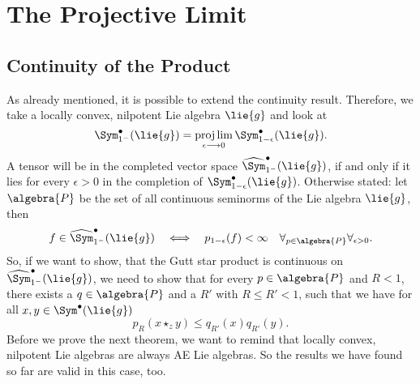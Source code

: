  
\section{The Projective Limit} 
\label{sec:chap6_ProjLim} 

\subsection{Continuity of the Product}

As already mentioned, it is possible to extend the continuity result. 
Therefore, we take a locally convex, nilpotent Lie algebra $\lie{g}$ and look at
\begin{equation*}
	\Sym_{1^-}^{\bullet}(\lie{g})
	=
	\projlim_{\epsilon \longrightarrow 0}
	\Sym_{1 - \epsilon}^{\bullet}(\lie{g}).
\end{equation*}
A tensor will be in the completed vector space $\widehat{\Sym}_{1^-}^{\bullet}
(\lie{g})$, if and only if it lies for every $\epsilon > 0$ in the completion of 
$\Sym_{1 - \epsilon}^{\bullet}(\lie{g})$. Otherwise stated: let $\algebra{P}$ 
be the set of all continuous seminorms of the Lie algebra $\lie{g}$, then 
\begin{equation*}
	f \in \widehat{\Sym}_{1^-}^{\bullet}(\lie{g})
	\quad \Longleftrightarrow \quad
	p_{1 - \epsilon} (f) 
	< 
	\infty
	\quad
	\forall_{p \in \algebra{P}}
	\forall_{\epsilon > 0}.
\end{equation*}
So, if we want to show, that the Gutt star product is continuous on 
$\widehat{\Sym}_{1^-}^{\bullet}(\lie{g})$, we need to show that for every 
$p \in \algebra{P}$ and  $R < 1$, there exists a $q \in \algebra{P}$ and a 
$R'$ with $R \leq R' < 1$, such that we have for all $x,y \in \Sym^{\bullet}
(\lie{g})$
\begin{equation*}
	p_R \left(
		x \star_z y
	\right)
	\leq
	q_{R'}(x)
	q_{R'}(y).
\end{equation*}
Before we prove the next theorem, we want to remind that locally convex, 
nilpotent Lie algebras are always AE Lie algebras. So the results we have 
found so far are valid in this case, too.
